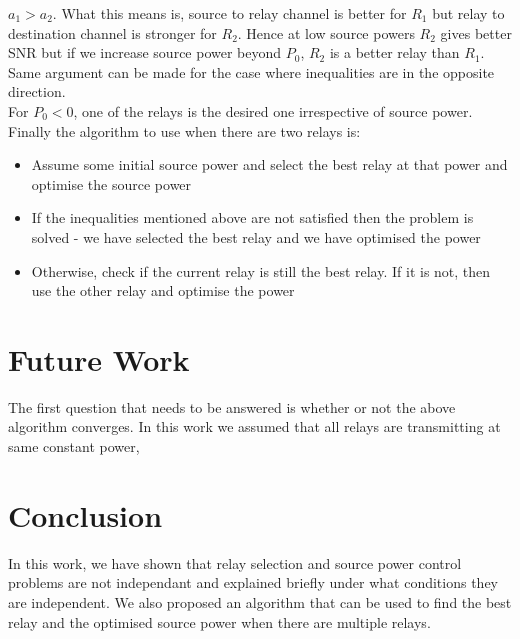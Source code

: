 \documentclass[conference]{IEEEtran}
\begin{document}
$a_1 > a_2$. What this means is, source to relay channel is 
better for $R_1$ but relay to destination channel is stronger
for $R_2$. Hence at low source powers $R_2$ gives
better SNR but if we increase source power beyond  $P_0$, $R_2$ 
is a better relay than $R_1$. Same argument can be made 
for the case where inequalities are in the opposite
direction. 
\\
For $P_0 < 0$, one of the relays is the desired one irrespective of source power.
\\
Finally the algorithm to use when there are two relays is:
\begin{itemize}
	\item Assume some initial source power and select the best relay at that power and optimise the source power
	\item If the inequalities mentioned above are not satisfied then the 
		problem is solved - we have selected the best relay and we have optimised the power
	\item Otherwise, check if the current relay is still the best relay. If it is 
		not, then use the other relay and optimise the power
\end{itemize}
\section{Future Work}
The first question that needs to be answered is whether or not the above
algorithm converges.
In this work we assumed that all relays are transmitting at same constant power,

\section{Conclusion}
In this work, we have shown that relay selection and source power control problems
are not independant and explained briefly under what conditions they are independent.
We also proposed an algorithm that can be used to find the best relay and the
optimised source power when there are multiple relays. 








\end{document}
